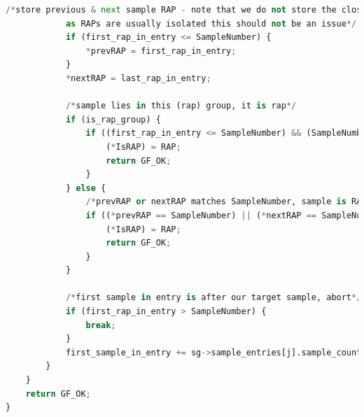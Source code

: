 \documentclass[10pt,UTF8]{ctexart}
\begin{document}
\begin{lstlisting}[language={python}]
			/*store previous & next sample RAP - note that we do not store the closest previous RAP, only the first of the previous RAP group
			as RAPs are usually isolated this should not be an issue*/
			if (first_rap_in_entry <= SampleNumber) {
				*prevRAP = first_rap_in_entry;
			}
			*nextRAP = last_rap_in_entry;
			
			/*sample lies in this (rap) group, it is rap*/
			if (is_rap_group) {
				if ((first_rap_in_entry <= SampleNumber) && (SampleNumber <= last_rap_in_entry)) {
					(*IsRAP) = RAP;
					return GF_OK;
				}
			} else {
				/*prevRAP or nextRAP matches SampleNumber, sample is RAP*/
				if ((*prevRAP == SampleNumber) || (*nextRAP == SampleNumber)) {
					(*IsRAP) = RAP;
					return GF_OK;
				}
			}

			/*first sample in entry is after our target sample, abort*/
			if (first_rap_in_entry > SampleNumber) {
				break;
			}
			first_sample_in_entry += sg->sample_entries[j].sample_count;
		}
	}
	return GF_OK;
}
\end{lstlisting}







\clearpage
\end{document}
